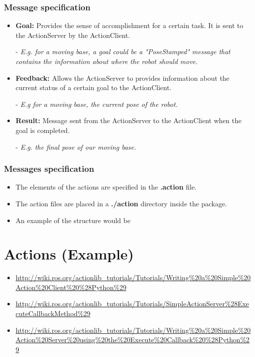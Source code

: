 \documentclass{beamer}
\begin{document}
	\begin{frame}
		\frametitle{Message specification}
		\begin{itemize}
			\item{\textbf{Goal: } Provides the sense of accomplishment for a certain task. It is sent to the ActionServer by the ActionClient.}
			\item[-]{ \textit{E.g. for a moving base, a goal could be a "PoseStamped" message that contains the information about where the robot should move.}}
			\item{\textbf{Feedback: } Allows the ActionServer to provides information about the current status of a certain goal to the ActionClient.}
			\item[-]{\textit{E.g for a moving base, the current pose of the robot.}}
			\item{\textbf{Result: } Message sent from the ActionServer to the ActionClient when the goal is completed.}
			\item[-]{\textit{E.g. the final pose of our moving base.}}
		\end{itemize}
	\end{frame}
	\begin{frame}
		\frametitle{Messages specification}
		\begin{itemize}
			\item{The elements of the actions are specified in the \textbf{.action} file.}
			\item{The action files are placed in a \textbf{./action} directory inside the package.}
			\item{An example of the structure would be}
			\sleepSort
		\end{itemize}
	\end{frame}
	\section{Actions (Example)}
	\begin{frame}
		\begin{itemize}
			\item{\url{http://wiki.ros.org/actionlib_tutorials/Tutorials/Writing\%20a\%20Simple\%20Action\%20Client\%20\%28Python\%29}}
			\item{\url{http://wiki.ros.org/actionlib_tutorials/Tutorials/SimpleActionServer\%28ExecuteCallbackMethod\%29}}
			\item{\url{http://wiki.ros.org/actionlib_tutorials/Tutorials/Writing\%20a\%20Simple\%20Action\%20Server\%20using\%20the\%20Execute\%20Callback\%20\%28Python\%29}}
		\end{itemize}
	\end{frame}
\end{document}
